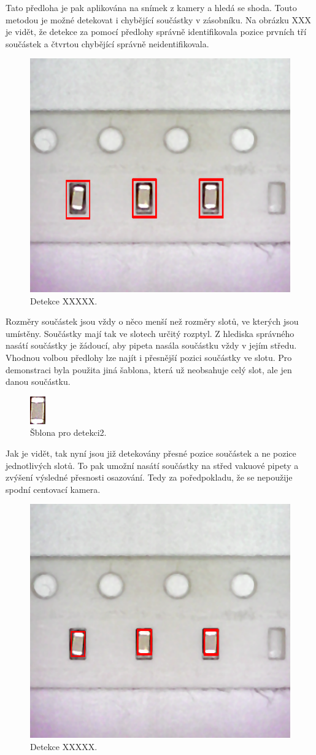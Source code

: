 Tato předloha je pak aplikována na snímek z kamery a hledá se shoda. Touto metodou je možné detekovat i chybějící součástky v zásobníku. Na obrázku XXX je vidět, že detekce za pomocí předlohy správně identifikovala pozice prvních tří součástek a čtvrtou chybějící správně neidentifikovala.
\begin{figure}[h!]
  \centering
    \includegraphics[width=0.5\linewidth]{obrazky/res2.png}%
    \caption{Detekce XXXXX.}
    \label{fig:tape3}
\end{figure}


Rozměry součástek jsou vždy o něco menší než rozměry slotů, ve kterých jsou umístěny. Součástky mají tak ve slotech určitý rozptyl. Z hlediska správného nasátí součástky je žádoucí, aby pipeta nasála součástku vždy v jejím středu. Vhodnou volbou předlohy lze najít i přesnější pozici součástky ve slotu.
Pro demonstraci byla použita jiná šablona, která už neobsahuje celý slot, ale jen danou součástku.
\begin{figure}[h!]
  \centering
    \includegraphics[width=0.1\linewidth]{obrazky/template2.png}%
    \caption{Šblona pro detekci2.}
    \label{fig:template2}
\end{figure}

Jak je vidět, tak nyní jsou již detekovány přesné pozice součástek a ne pozice jednotlivých slotů. To pak umožní nasátí součástky na střed vakuové pipety a zvýšení výsledné přesnosti osazování. Tedy za poředpokladu, že se nepoužije spodní centovací kamera. 
\begin{figure}[h!]
  \centering
    \includegraphics[width=0.5\linewidth]{obrazky/res3.png}%
    \caption{Detekce XXXXX.}
    \label{fig:tape4}
\end{figure}


